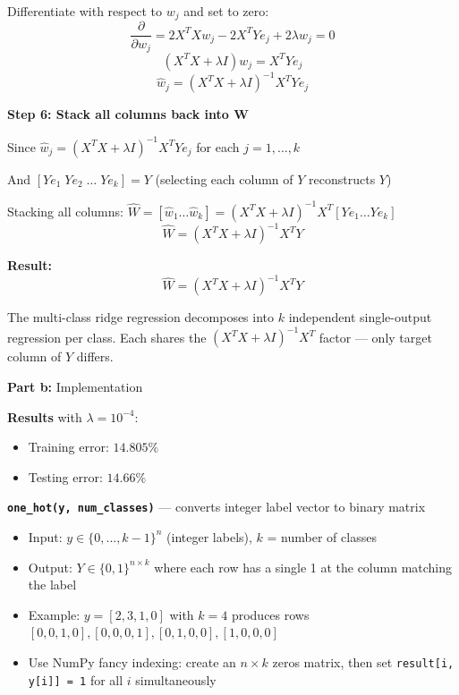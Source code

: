 \documentclass{article}
\begin{document}
Differentiate with respect to $w_j$ and set to zero:
\[
    \frac{\partial}{\partial w_j} = 2X^T X w_j - 2X^T Y e_j + 2\lambda w_j = 0
\]
\[
    (X^T X + \lambda I) w_j = X^T Y e_j
\]
\[
    \hat{w}_j = (X^T X + \lambda I)^{-1} X^T Y e_j
\]

\medskip
\textbf{Step 6: Stack all columns back into W}

Since $\hat{w}_j = (X^T X + \lambda I)^{-1} X^T Y e_j$ for each $j = 1, \ldots, k$

And $[Ye_1 \; Ye_2 \; \ldots \; Ye_k] = Y$ (selecting each column of $Y$ reconstructs $Y$)

Stacking all columns: $\hat{W} = [\hat{w}_1 \ldots \hat{w}_k] = (X^T X + \lambda I)^{-1} X^T [Ye_1 \ldots Ye_k]$
\[
    \boxed{\hat{W} = (X^T X + \lambda I)^{-1} X^T Y}
\]

\textbf{Result:}
\[
    \hat{W} = (X^T X + \lambda I)^{-1} X^T Y
\]

The multi-class ridge regression decomposes into $k$ independent single-output regression per class. Each shares the $(X^T X + \lambda I)^{-1} X^T$ factor --- only target column of $Y$ differs.

\bigskip
\begin{mdframed}
\textbf{\large Part b:} Implementation
\end{mdframed}

\textbf{Results} with $\lambda = 10^{-4}$:
\begin{itemize}
    \item Training error: $\boxed{14.805\%}$
    \item Testing error: $\boxed{14.66\%}$
\end{itemize}

\medskip
\textbf{\texttt{one\_hot(y, num\_classes)}} --- converts integer label vector to binary matrix
\begin{itemize}
    \item Input: $y \in \{0, \ldots, k-1\}^n$ (integer labels), $k$ = number of classes
    \item Output: $Y \in \{0,1\}^{n \times k}$ where each row has a single 1 at the column matching the label
    \item Example: $y = [2, 3, 1, 0]$ with $k=4$ produces rows $[0,0,1,0], [0,0,0,1], [0,1,0,0], [1,0,0,0]$
    \item Use NumPy fancy indexing: create an $n \times k$ zeros matrix, then set \texttt{result[i, y[i]] = 1} for all $i$ simultaneously
\end{itemize}
\end{document}
